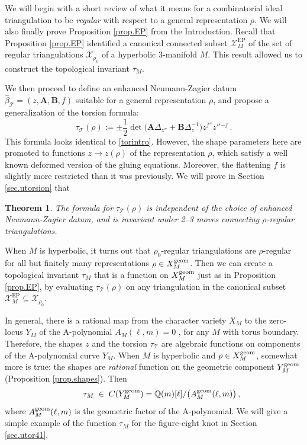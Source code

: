 \documentclass[12pt]{amsart}
\newcommand{\lbl}{\label}
\newtheorem{theorem}{Theorem}[section]
\theoremstyle{definition}
\def\BQ{\mathbb Q}
\def\calX{\mathcal X}
\def\be{  \begin{equation} }
\def\ee{  \end{equation} }
\def\EP{\mathrm{EP}}
\newcommand{\CT}{\mathcal{T}}
\newcommand{\mb}{\mathbf}
\numberwithin{equation}{section}
\begin{document}
We will begin with a short review of what it means for a combinatorial 
ideal triangulation to be \emph{regular} with respect to a general 
representation $\rho$. We will also finally prove Proposition \ref{prop.EP} 
from the Introduction. Recall that Proposition \ref{prop.EP} identified a 
canonical connected subset $\calX^{\EP}_M$ of the set of regular triangulations 
$\calX_{\rho_0}$ of a hyperbolic 3-manifold $M$. This result allowed us to 
construct the topological invariant $\tau_M$.



We then proceed to define an enhanced Neumann-Zagier datum 
$\widehat\beta_\CT=(z,\mb A,\mb B,f)$ suitable for a general representation 
$\rho$, and propose a generalization of the torsion formula:
%
\be 
\lbl{utor} 
\tau_\CT(\rho) := \pm\frac12\det\big(\mb A\Delta_{z''}
+\mb B\Delta_z^{-1}\big)z^{f''}z''{}^{-f}  \,.
\ee
%
This formula looks identical to \eqref{torintro}. However, the shape parameters here are promoted to functions $z\to z(\rho)$ of the representation $\rho$, which satisfy a well known deformed version of the gluing equations. Moreover, the flattening $f$ is slightly more restricted than it was previously. %
We will prove in Section \ref{sec.utorsion} that

\begin{theorem}\lbl{thm.utor}
The formula for $\tau_\CT(\rho)$ is independent of the choice of enhanced Neumann-Zagier datum, and is invariant under 2--3 moves connecting $\rho$-regular triangulations.
\end{theorem}

\noindent When $M$ is hyperbolic, it turns out that $\rho_0$-regular triangulations are $\rho$-regular for all but finitely many representations $\rho\in X_M^{\rm geom}$. Then we can create a topological invariant $\tau_M$ that is a function on $X_M^{\rm geom}$ just as in Proposition \ref{prop.EP}, by evaluating $\tau_\CT(\rho)$ on any triangulation in the canonical subset $\calX^{\EP}_M\subseteq \calX_{\rho_0}$. 

In general, there is a rational map from the character variety $X_M$ to the zero-locus $Y_M$ of the A-polynomial $A_M(\ell,m)=0$ \cite{CCGLS}, for any $M$ with torus boundary. Therefore, the shapes $z$ and the torsion $\tau_\CT$ are algebraic functions on components of the A-polynomial curve $Y_M$. When $M$ is hyperbolic and $\rho\in X_M^{\rm geom}$, somewhat more is true: the shapes are \emph{rational} function on the geometric component $Y_M^{\rm geom}$ (Proposition \ref{prop.shapes}). Then
%
\be \qquad  \tau_M \;\in\; C(Y_M^{\rm geom}) = \BQ(m)[\ell]/\big(A_M^{\rm geom}(\ell,m)\big)\,,
\ee
%
where $A^{\rm geom}_M(\ell,m)$ is the geometric factor of the A-polynomial. We will give a simple example of the function $\tau_M$ for the figure-eight knot in Section \ref{sec.utor41}.
\end{document}
